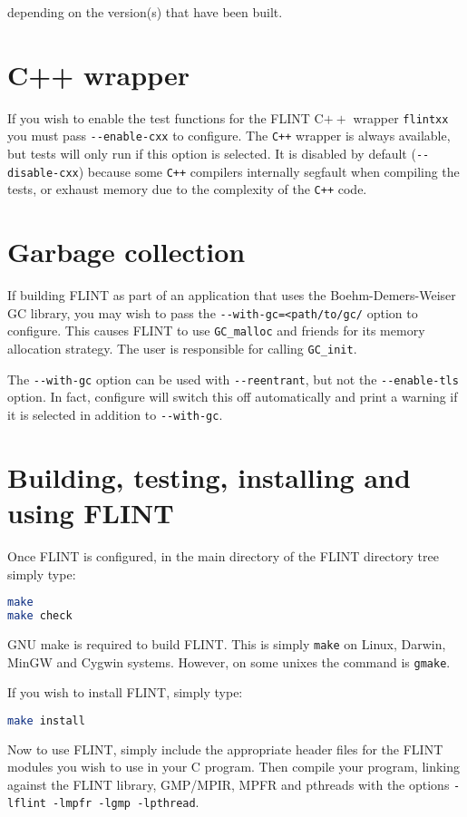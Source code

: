\documentclass[a4paper,10pt]{book}
\newcommand{\code}{\lstinline}
\begin{document}
depending on the version(s) that have been built.

\chapter{C++ wrapper}

If you wish to enable the test functions for the FLINT C$++$ wrapper
\code{flintxx} you must pass \code{--enable-cxx} to configure. The
\code{C++} wrapper is always available, but tests will only run if
this option is selected. It is disabled by default (\code{--disable-cxx})
because some \code{C++} compilers internally segfault when compiling the
tests, or exhaust memory due to the complexity of the \code{C++} code.

\chapter{Garbage collection}

If building FLINT as part of an application that uses the
Boehm-Demers-Weiser GC library, you may wish to pass the
\code{--with-gc=<path/to/gc/} option to configure. This causes
FLINT to use \code{GC_malloc} and friends for its memory allocation
strategy. The user is responsible for calling \code{GC_init}.

The \code{--with-gc} option can be used with \code{--reentrant}, but not the
\code{--enable-tls} option. In fact, configure will switch this off
automatically and print a warning if it is selected in addition to
\code{--with-gc}.

\chapter{Building, testing, installing and using FLINT}

Once FLINT is configured, in the main directory of the FLINT directory
tree simply type:
\begin{lstlisting}[language=bash]
make
make check
\end{lstlisting}

GNU make is required to build FLINT. This is simply \code{make} on
Linux, Darwin, MinGW and Cygwin systems. However, on some unixes the
command is \code{gmake}.

If you wish to install FLINT, simply type:
\begin{lstlisting}[language=bash]
make install
\end{lstlisting}

Now to use FLINT, simply include the appropriate header files for
the FLINT modules you wish to use in your C program.  Then compile
your program, linking against the FLINT library, GMP/MPIR, MPFR and
pthreads with the options \code{-lflint -lmpfr -lgmp -lpthread}.
\end{document}
